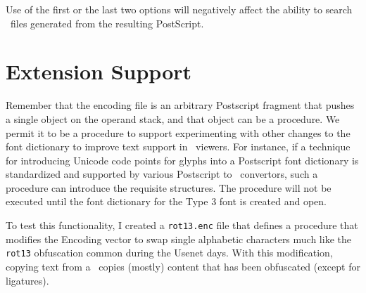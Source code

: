\documentclass{ltugboat}
\def\PDF{\acro{PDF}}
\begin{document}
Use of the first or the last two options will negatively affect the
ability to search \PDF\ files generated from the resulting
PostScript.

\section{Extension Support}

Remember that the encoding file is an arbitrary Postscript fragment
that pushes a single object on the operand stack, and that object
can be a procedure.  We permit it to be a procedure to support
experimenting with other changes to the font dictionary to improve
text support in \PDF\ viewers.  For instance, if a technique for
introducing Unicode code points for glyphs into a Postscript font
dictionary is standardized and supported by various Postscript
to \PDF\ convertors, such a procedure can introduce the requisite
structures.  The procedure will not be executed until the
font dictionary for the Type 3 font is created and open.

To test this functionality, I created a \texttt{rot13.enc} file
that defines a procedure that modifies the Encoding vector to swap
single alphabetic characters much like the \texttt{rot13} obfuscation
common during the Usenet days.  With this modification, copying
text from a \PDF\ copies (mostly) content that has been obfuscated
(except for ligatures).


\makesignature
\end{document}
